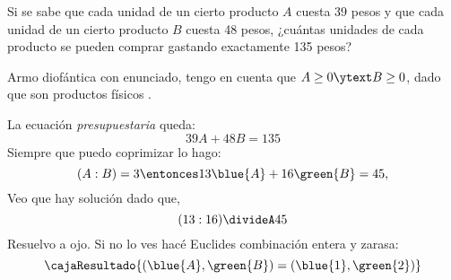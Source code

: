 \begin{enunciado}{\ejercicio}
  Si se sabe que cada unidad de un cierto producto $A$ cuesta $39$ pesos y que cada unidad de un cierto
  producto $B$ cuesta 48 pesos, ¿cuántas unidades de cada producto se pueden comprar gastando exactamente
  135 pesos?
\end{enunciado}

Armo diofántica con enunciado, tengo en cuenta que
$A \geq 0 \ytext B \geq 0$, dado que son productos físicos {}.

La ecuación \textit{presupuestaria} queda:
$$
  39A + 48B = 135
$$
Siempre que puedo coprimizar lo hago:
$$
  (A:B) = 3
  \entonces
  13 \blue{A} + 16\green{B} = 45,
$$
Veo que hay solución dado que,
$$
  (13:16) \divideA 45
$$
Resuelvo a ojo. Si no lo ves hacé Euclides combinación entera y zarasa:
$$
  \cajaResultado{
    (\blue{A},\green{B}) = (\blue{1},\green{2})
  }
$$

\begin{aportes}
  \item {}
  \item {}
\end{aportes}

